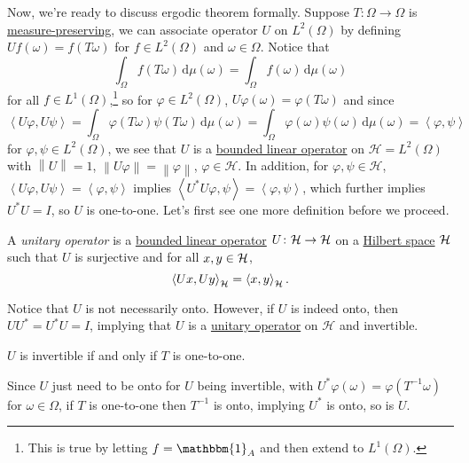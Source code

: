 Now, we're ready to discuss ergodic theorem formally. Suppose \(T\colon \Omega \to \Omega\) is \hyperref[def:measure-preserving]{measure-preserving}, we can associate operator \(U\) on \(L^2(\Omega)\) by defining \(U f(\omega) = f(T \omega)\) for \(f\in L^2(\Omega )\) and \(\omega \in \Omega\). Notice that
\[
	\int_\Omega f(T \omega) \,\mathrm{d} \mu(\omega) = \int_\Omega f(\omega) \,\mathrm{d} \mu(\omega)
\]
for all \(f\in L^1(\Omega )\),\footnote{This is true by letting \(f = \mathbbm{1}_A\) and then extend to \(L^1(\Omega)\).} so for \(\varphi \in L^2(\Omega)\), \(U \varphi(\omega) = \varphi (T \omega)\) and since
\[
	\left\langle U \varphi, U \psi \right\rangle
	= \int_\Omega \varphi(T \omega) \psi(T \omega) \,\mathrm{d} \mu(\omega)
	= \int_\Omega \varphi(\omega) \psi(\omega) \,\mathrm{d} \mu(\omega)
	= \left\langle \varphi, \psi \right\rangle
\]
for \(\varphi,\psi \in L^2(\Omega)\), we see that \(U\) is a \hyperref[def:bounded-linear-op]{bounded linear operator} on \(\mathcal{H} = L^2(\Omega)\) with \(\left\lVert U\right\rVert  = 1\), \(\left\lVert U\varphi \right\rVert = \left\lVert \varphi \right\rVert\), \(\varphi \in \mathcal{H}\). In addition, for \(\varphi,\psi \in \mathcal{H}\), \(\left\langle U \varphi, U \psi \right\rangle = \left\langle \varphi, \psi \right\rangle\) implies \(\left\langle U^{\ast} U \varphi, \psi \right\rangle = \left\langle \varphi, \psi \right\rangle\), which further implies \(U^{\ast} U = I\), so \(U\) is one-to-one. Let's first see one more definition before we proceed.

\begin{definition}\label{def:unitary-op}
	A \emph{unitary operator} is a \hyperref[def:bounded-linear-op]{bounded linear operator} \(U\colon \mathcal{\MakeUppercase{h}} \to \mathcal{\MakeUppercase{h}} \) on a \hyperref[def:Hilbert-space]{Hilbert space} \(\mathcal{\MakeUppercase{h}} \) such that \(U\) is surjective and for all \(x, y\in \mathcal{\MakeUppercase{h}} \),
	\[
		\left\langle Ux, Uy \right\rangle _{\mathcal{\MakeUppercase{h}} } = \left\langle x, y \right\rangle _{\mathcal{\MakeUppercase{h}} }.
	\]
\end{definition}

Notice that \(U\) is not necessarily onto. However, if \(U\) is indeed onto, then \(UU^{\ast} = U^{\ast} U = I\), implying that \(U\) is a \hyperref[def:unitary-op]{unitary operator} on \(\mathcal{H}\) and invertible.

\begin{note}
	\(U\) is invertible if and only if \(T\) is one-to-one.
\end{note}
\begin{explanation}
	Since \(U\) just need to be onto for \(U\) being invertible, with \(U^{\ast} \varphi(\omega) = \varphi(T^{-1} \omega)\) for \(\omega \in \Omega\), if \(T\) is one-to-one then \(T^{-1} \) is onto, implying \(U^{\ast} \) is onto, so is \(U\).
\end{explanation}

